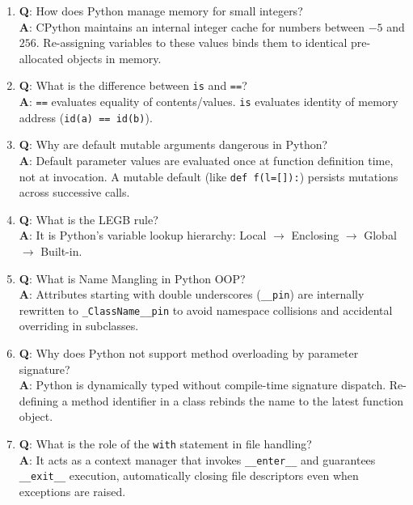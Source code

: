 \begin{enumerate}[leftmargin=1.5em]
    \item \textbf{Q}: How does Python manage memory for small integers?\\
    \textbf{A}: CPython maintains an internal integer cache for numbers between $-5$ and $256$. Re-assigning variables to these values binds them to identical pre-allocated objects in memory.

    \item \textbf{Q}: What is the difference between \texttt{is} and \texttt{==}?\\
    \textbf{A}: \texttt{==} evaluates equality of contents/values. \texttt{is} evaluates identity of memory address (\texttt{id(a) == id(b)}).

    \item \textbf{Q}: Why are default mutable arguments dangerous in Python?\\
    \textbf{A}: Default parameter values are evaluated once at function definition time, not at invocation. A mutable default (like \texttt{def f(l=[]):}) persists mutations across successive calls.

    \item \textbf{Q}: What is the LEGB rule?\\
    \textbf{A}: It is Python's variable lookup hierarchy: Local $\to$ Enclosing $\to$ Global $\to$ Built-in.

    \item \textbf{Q}: What is Name Mangling in Python OOP?\\
    \textbf{A}: Attributes starting with double underscores (\texttt{\_\_pin}) are internally rewritten to \texttt{\_ClassName\_\_pin} to avoid namespace collisions and accidental overriding in subclasses.

    \item \textbf{Q}: Why does Python not support method overloading by parameter signature?\\
    \textbf{A}: Python is dynamically typed without compile-time signature dispatch. Re-defining a method identifier in a class rebinds the name to the latest function object.

    \item \textbf{Q}: What is the role of the \texttt{with} statement in file handling?\\
    \textbf{A}: It acts as a context manager that invokes \texttt{\_\_enter\_\_} and guarantees \texttt{\_\_exit\_\_} execution, automatically closing file descriptors even when exceptions are raised.


\end{enumerate}
